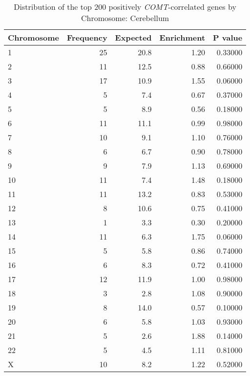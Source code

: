\begin{longtable}{lrrrr}
\caption{Distribution of the top 200 positively \textit{COMT}-correlated genes by \\ Chromosome: Cerebellum} \\ 
  \toprule
Chromosome & Frequency & Expected & Enrichment & P value \\ 
  \midrule
1 & 25 & 20.8 & 1.20 & 0.33000 \\ 
  2 & 11 & 12.5 & 0.88 & 0.66000 \\ 
  3 & 17 & 10.9 & 1.55 & 0.06000 \\ 
  4 & 5 & 7.4 & 0.67 & 0.37000 \\ 
  5 & 5 & 8.9 & 0.56 & 0.18000 \\ 
  6 & 11 & 11.1 & 0.99 & 0.98000 \\ 
  7 & 10 & 9.1 & 1.10 & 0.76000 \\ 
  8 & 6 & 6.7 & 0.90 & 0.78000 \\ 
  9 & 9 & 7.9 & 1.13 & 0.69000 \\ 
  10 & 11 & 7.4 & 1.48 & 0.18000 \\ 
  11 & 11 & 13.2 & 0.83 & 0.53000 \\ 
  12 & 8 & 10.6 & 0.75 & 0.41000 \\ 
  13 & 1 & 3.3 & 0.30 & 0.20000 \\ 
  14 & 11 & 6.3 & 1.75 & 0.06000 \\ 
  15 & 5 & 5.8 & 0.86 & 0.74000 \\ 
  16 & 6 & 8.3 & 0.72 & 0.41000 \\ 
  17 & 12 & 11.9 & 1.00 & 0.98000 \\ 
  18 & 3 & 2.8 & 1.08 & 0.90000 \\ 
  19 & 8 & 14.0 & 0.57 & 0.10000 \\ 
  20 & 6 & 5.8 & 1.03 & 0.93000 \\ 
  21 & 5 & 2.6 & 1.88 & 0.14000 \\ 
  22 & 5 & 4.5 & 1.11 & 0.81000 \\ 
  X & 10 & 8.2 & 1.22 & 0.52000 \\ 
   \bottomrule
\end{longtable}
